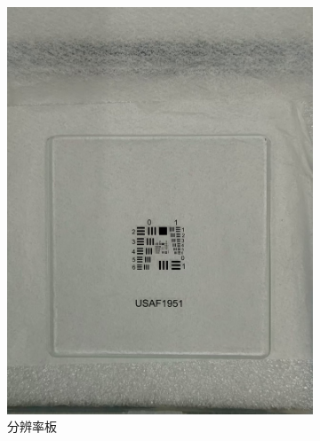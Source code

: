 \documentclass[a4paper]{report} %
\begin{document}
\begin{figure}[H]
    \begin{subfigure}{0.22\textwidth}
        \includegraphics[width=\linewidth]{分辨率板.jpg}
        \caption{分辨率板}
    \end{subfigure}
    \begin{subfigure}{0.22\textwidth}

\end{subfigure}
\end{figure}
\end{document}

